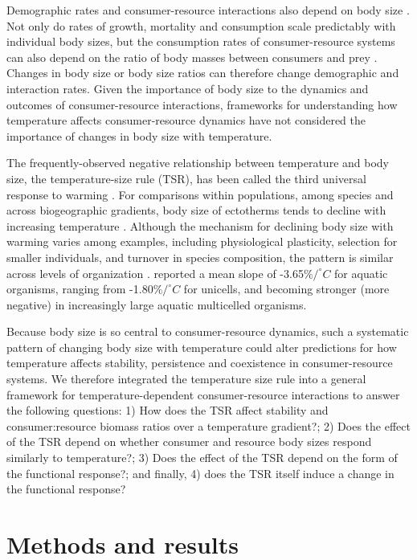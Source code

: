 \documentclass[11pt]{article}
\begin{document}
Demographic rates and consumer-resource interactions also depend on body size \citep{Yodzis1992,DeLong2015}. 
Not only do rates of growth, mortality and consumption scale predictably with individual body sizes, but the consumption rates of consumer-resource systems can also depend on the ratio of body masses between consumers and prey \citep{Kalinkat2013}. 
Changes in body size or body size ratios can therefore change demographic and interaction rates. Given the importance of body size to the dynamics and outcomes of consumer-resource interactions, frameworks for understanding how temperature affects consumer-resource dynamics have not considered the importance of changes in body size with temperature.

The frequently-observed negative relationship between temperature and body size, the temperature-size rule (TSR), has been called the third universal response to warming \citep{Gardner2011}. 
For comparisons within populations, among species and across biogeographic gradients, body size of ectotherms tends to decline with increasing temperature \citep{Atkinson1994,Daufresne2009,Forster2012,DeLong2012}. 
Although the mechanism for declining body size with warming varies among examples, including physiological plasticity, selection for smaller individuals, and turnover in species composition, the pattern is similar across levels of organization \citep{Forster2012}. 
\citet{Forster2012} reported a mean slope of -3.65$\%/ ^\circ C$ for aquatic organisms, ranging from -1.80$\% / ^\circ C$ for unicells, and becoming stronger (more negative) in increasingly large aquatic multicelled organisms.

Because body size is so central to consumer-resource dynamics, such a systematic pattern of changing body size with temperature could alter predictions for how temperature affects stability, persistence and coexistence in consumer-resource systems. 
We therefore integrated the temperature size rule into a general framework for temperature-dependent consumer-resource interactions to answer the following questions: 
1) How does the TSR affect stability and consumer:resource biomass ratios over a temperature gradient?;
2) Does the effect of the TSR depend on whether consumer and resource body sizes respond similarly to temperature?; 
3) Does the effect of the TSR depend on the form of the functional response?; 
and finally, 4) does the TSR itself induce a change in the functional response?

\section*{Methods and results}
\end{document}
